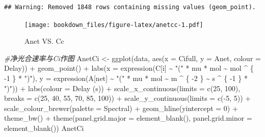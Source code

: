\documentclass[
]{krantz}
\makeatletter
\newenvironment{Shaded}{\begin{snugshade}}{\end{snugshade}}
\newcommand{\AttributeTok}[1]{\textcolor[rgb]{0.77,0.63,0.00}{#1}}
\newcommand{\CommentTok}[1]{\textcolor[rgb]{0.56,0.35,0.01}{\textit{#1}}}
\newcommand{\DecValTok}[1]{\textcolor[rgb]{0.00,0.00,0.81}{#1}}
\newcommand{\FunctionTok}[1]{\textcolor[rgb]{0.00,0.00,0.00}{#1}}
\newcommand{\NormalTok}[1]{#1}
\newcommand{\OtherTok}[1]{\textcolor[rgb]{0.56,0.35,0.01}{#1}}
\newcommand{\SpecialCharTok}[1]{\textcolor[rgb]{0.00,0.00,0.00}{#1}}
\newcommand{\StringTok}[1]{\textcolor[rgb]{0.31,0.60,0.02}{#1}}
\newenvironment{kframe}{%
\medskip{}
\setlength{\fboxsep}{.8em}
 \def\at@end@of@kframe{}%
 \ifinner\ifhmode%
  \def\at@end@of@kframe{\end{minipage}}%
  \begin{minipage}{\columnwidth}%
 \fi\fi%
 \def\FrameCommand##1{\hskip\@totalleftmargin \hskip-\fboxsep
 \colorbox{shadecolor}{##1}\hskip-\fboxsep
     \hskip-\linewidth \hskip-\@totalleftmargin \hskip\columnwidth}%
 \MakeFramed {\advance\hsize-\width
   \@totalleftmargin\z@ \linewidth\hsize
   \@setminipage}}%
 {\par\unskip\endMakeFramed%
 \at@end@of@kframe}
\renewenvironment{Shaded}{\begin{kframe}}{\end{kframe}}
\makeatother
\begin{document}
\begin{verbatim}
## Warning: Removed 1848 rows containing missing values (geom_point).
\end{verbatim}

\begin{figure}
\centering
\texttt{[image: bookdown\_files/figure-latex/anetcc-1.pdf]}
\caption{\label{fig:anetcc}Anet VS. Cc}
\end{figure}

\begin{Shaded}
\begin{Highlighting}[]
\CommentTok{\#净光合速率与Ci作图}
\NormalTok{AnetCi }\OtherTok{\textless{}{-}} \FunctionTok{ggplot}\NormalTok{(data, }\FunctionTok{aes}\NormalTok{(}\AttributeTok{x =}\NormalTok{ Cifull, }\AttributeTok{y =}\NormalTok{ Anet, }\AttributeTok{colour =}\NormalTok{ Delay)) }\SpecialCharTok{+}
  \FunctionTok{geom\_point}\NormalTok{() }\SpecialCharTok{+}
  \FunctionTok{labs}\NormalTok{(}\AttributeTok{x =} \FunctionTok{expression}\NormalTok{(C[i] }\SpecialCharTok{\textasciitilde{}} \StringTok{"("} \SpecialCharTok{*}\NormalTok{ mu }\SpecialCharTok{*}\NormalTok{ mol }\SpecialCharTok{\textasciitilde{}}\NormalTok{ mol }\SpecialCharTok{\^{}}\NormalTok{ \{}
    \SpecialCharTok{{-}}\DecValTok{1}
\NormalTok{  \} }\SpecialCharTok{*} \StringTok{")"}\NormalTok{),}
  \AttributeTok{y =} \FunctionTok{expression}\NormalTok{(A[net] }\SpecialCharTok{\textasciitilde{}} \StringTok{"("} \SpecialCharTok{*}\NormalTok{ mu }\SpecialCharTok{*}\NormalTok{ mol }\SpecialCharTok{\textasciitilde{}}\NormalTok{ m }\SpecialCharTok{\^{}}\NormalTok{ \{}
    \SpecialCharTok{{-}}\DecValTok{2}
\NormalTok{  \} }\SpecialCharTok{\textasciitilde{}}\NormalTok{ s }\SpecialCharTok{\^{}}\NormalTok{ \{}
    \SpecialCharTok{{-}}\DecValTok{1}
\NormalTok{  \} }\SpecialCharTok{*} \StringTok{")"}\NormalTok{)) }\SpecialCharTok{+}
  \FunctionTok{labs}\NormalTok{(}\AttributeTok{colour =} \StringTok{\textquotesingle{}Delay (s)\textquotesingle{}}\NormalTok{) }\SpecialCharTok{+}
  \FunctionTok{scale\_x\_continuous}\NormalTok{(}\AttributeTok{limits =} \FunctionTok{c}\NormalTok{(}\DecValTok{25}\NormalTok{, }\DecValTok{100}\NormalTok{),}
                     \AttributeTok{breaks =} \FunctionTok{c}\NormalTok{(}\DecValTok{25}\NormalTok{, }\DecValTok{40}\NormalTok{, }\DecValTok{55}\NormalTok{, }\DecValTok{70}\NormalTok{, }\DecValTok{85}\NormalTok{, }\DecValTok{100}\NormalTok{)) }\SpecialCharTok{+}
  \FunctionTok{scale\_y\_continuous}\NormalTok{(}\AttributeTok{limits =} \FunctionTok{c}\NormalTok{(}\SpecialCharTok{{-}}\DecValTok{5}\NormalTok{, }\DecValTok{5}\NormalTok{)) }\SpecialCharTok{+}
  \FunctionTok{scale\_colour\_brewer}\NormalTok{(}\AttributeTok{palette =} \StringTok{\textquotesingle{}Spectral\textquotesingle{}}\NormalTok{) }\SpecialCharTok{+}
  \FunctionTok{geom\_hline}\NormalTok{(}\AttributeTok{yintercept =} \DecValTok{0}\NormalTok{) }\SpecialCharTok{+}
  \FunctionTok{theme\_bw}\NormalTok{() }\SpecialCharTok{+}
  \FunctionTok{theme}\NormalTok{(}\AttributeTok{panel.grid.major =} \FunctionTok{element\_blank}\NormalTok{(),}
        \AttributeTok{panel.grid.minor =} \FunctionTok{element\_blank}\NormalTok{())}
\NormalTok{AnetCi}
\end{Highlighting}
\end{Shaded}
\end{document}
